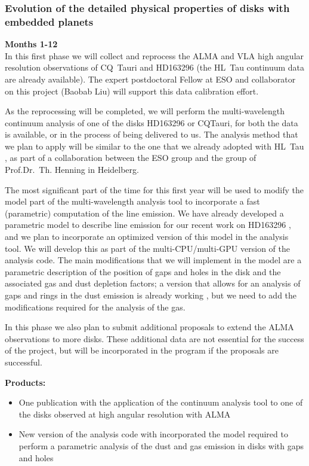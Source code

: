 \documentclass[10pt,fleqn,twoside]{article}
\begin{document}
\subsubsection{Evolution of the detailed physical properties of disks with embedded planets}

{\Tcol\bf Months 1-12}\\
In this first phase we will collect and reprocess the ALMA and VLA high angular resolution observations of CQ~Tauri and HD163296 (the HL~Tau continuum data are already available). The expert postdoctoral Fellow at ESO and collaborator on this project (Baobab Liu) will support this data calibration effort. 

As the reprocessing will be completed, we will perform the multi-wavelength continuum analysis of one of the disks HD163296 or CQTauri, for both the data is available, or in the process of being delivered to us. The analysis method that we plan to apply will be similar to the one that we already adopted with HL~Tau \citep{2016ApJ...821L..16C}, as part of a collaboration between the ESO group and the group of Prof.Dr.~Th. Henning in Heidelberg. 

The most significant part of the time for this first year will be used to modify the model part of the multi-wavelength analysis tool to incorporate a fast (parametric) computation of the line emission. We have already developed a parametric model to describe line emission for our recent work on HD163296 \citep{Isella2016}, and we plan to incorporate an optimized version of this model in the analysis tool. 
We will develop this as part of the multi-CPU/multi-GPU version of the analysis code.  The main modifications that we will implement in the model are a parametric description of the position of gaps and holes in the disk and the associated gas and dust depletion factors; a version that allows for an analysis of gaps and rings in the dust emission is already working \citep[e.g.\ ][]{2016A&A...588A.112G}, but we need to add the modifications required for the analysis of the gas.

In this phase we also plan to submit additional proposals to extend the ALMA observations to more disks. These additional data are not essential for the success of the project, but will be incorporated in the program if the proposals are successful.

\smallskip
{\bf Products:} 
\begin{itemize}
\item One publication with the application of the continuum analysis tool to one of the disks observed at high angular resolution with ALMA
\item New version of the analysis code with incorporated the model required to perform a parametric analysis of the dust and gas emission in disks with gaps and holes
\end{itemize}
\end{document}
